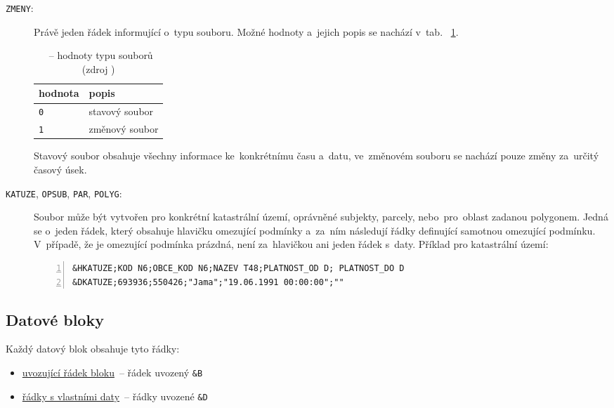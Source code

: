 \begin{description}
	\item[\texttt{ZMENY}:] Právě jeden řádek informující o~typu
souboru. Možné hodnoty a~jejich popis se nachází v~tab.~
\ref{tab:zmeny}.

    \begin{table}[H]
        \begin{tabular}{|l|l|} \hline hodnota & popis \\ \hline \hline
\texttt{0} & stavový soubor \\ \hline \texttt{1} & změnový soubor \\
\hline
        \end{tabular} \centering
        \caption[~– hodnoty typu souborů]{~– hodnoty
typu souborů (zdroj \citep{struktura_vfk})}
        \label{tab:zmeny}
    \end{table}

Stavový soubor obsahuje všechny informace ke~konkrétnímu času a~datu,
ve~změno\-vém souboru se nachází pouze změny za~určitý časový úsek.

	\item[\texttt{KATUZE}, \texttt{OPSUB}, \texttt{PAR},
\texttt{POLYG}:] Soubor  může být vytvořen pro konkrétní
kata\-strální území, oprávněné subjekty, parcely, nebo~pro~oblast
zadanou polygonem. Jedná se o~jeden řádek, který obsahuje hlavičku
omezující podmínky a~za~ním následují řádky definující samotnou
omezující podmínku. V~případě, že je omezující podmínka prázdná, není
za~hlavičkou ani jeden řádek s~daty. Příklad pro katastrální území:

\begin{lstlisting}[basicstyle=\footnotesize\ttfamily, backgroundcolor
    = \color{light-gray}, numbers=left]
&HKATUZE;KOD N6;OBCE_KOD N6;NAZEV T48;PLATNOST_OD D; PLATNOST_DO D
&DKATUZE;693936;550426;"Jama";"19.06.1991 00:00:00";""
 \end{lstlisting}

\end{description}

\subsection{Datové bloky}
\label{datove_bloky}

Každý datový blok obsahuje tyto řádky:
	\begin{itemize}[leftmargin=1.5cm, noitemsep]
		\item \underline{uvozující řádek bloku}~– řádek
uvozený \texttt{\&B}
		\item \underline{řádky s vlastními daty}~– řádky
uvozené \texttt{\&D}
	\end{itemize}

